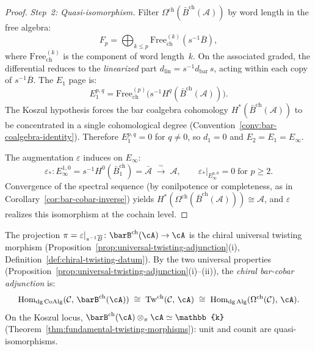\begin{proof}
\emph{Step~2: Quasi-isomorphism.}
Filter $\Omega^{\mathrm{ch}}(\bar{B}^{\mathrm{ch}}(\mathcal{A}))$
by word length in the free algebra:
\[
F_p = \bigoplus_{k \leq p}
\mathrm{Free}_{\mathrm{ch}}^{(k)}(s^{-1}\overline{B}),
\]
where $\mathrm{Free}_{\mathrm{ch}}^{(k)}$ is the component of
word length~$k$.
On the associated graded, the differential reduces to the
\emph{linearized} part $d_{\mathrm{lin}} = s^{-1} d_{\mathrm{bar}}\, s$,
acting within each copy of $s^{-1}\overline{B}$.
The $E_1$ page is:
\[
E_1^{p,q}
= \mathrm{Free}_{\mathrm{ch}}^{(p)}\!\bigl(
  s^{-1} H^q(\bar{B}^{\mathrm{ch}}(\mathcal{A}))
\bigr).
\]
The Koszul hypothesis forces the bar coalgebra cohomology
$H^*(\bar{B}^{\mathrm{ch}}(\mathcal{A}))$
to be concentrated in a single cohomological degree
(Convention~\ref{conv:bar-coalgebra-identity}).
Therefore $E_1^{p,q} = 0$ for $q \neq 0$, so $d_1 = 0$ and
$E_2 = E_1 = E_\infty$.

The augmentation $\varepsilon$ induces on $E_\infty$:
\[
\varepsilon_*\colon E_\infty^{1,0}
= s^{-1}H^0(\bar{B}^{\mathrm{ch}}_1) = \bar{\mathcal{A}}
\;\xrightarrow{\;\sim\;}\; \mathcal{A},
\qquad
\varepsilon_*|_{E_\infty^{p,0}} = 0 \;\text{for } p \geq 2.
\]
Convergence of the spectral sequence (by conilpotence or
completeness, as in
Corollary~\ref{cor:bar-cobar-inverse})
yields
$H^*(\Omega^{\mathrm{ch}}(\bar{B}^{\mathrm{ch}}(\mathcal{A})))
\cong \mathcal{A}$,
and $\varepsilon$ realizes this isomorphism at the cochain level.
\end{proof}

\begin{remark}
\label{rem:chiral-adjunction-via-tw}
The projection
$\pi = \varepsilon|_{s^{-1}\overline{B}}\colon
\barB^{\mathrm{ch}}(\cA) \to \cA$
is the chiral universal twisting morphism
(Proposition~\ref{prop:universal-twisting-adjunction}(i),
Definition~\ref{def:chiral-twisting-datum}).
By the two universal properties
(Proposition~\ref{prop:universal-twisting-adjunction}(i)--(ii)),
the \emph{chiral bar-cobar adjunction} is:
\begin{equation}\label{eq:chiral-tw-adjunction}
\mathrm{Hom}_{\mathrm{dg\,CoAlg}}(\mathcal{C},\,
  \barB^{\mathrm{ch}}(\cA))
\;\cong\;
\mathrm{Tw}^{\mathrm{ch}}(\mathcal{C},\, \cA)
\;\cong\;
\mathrm{Hom}_{\mathrm{dg\,Alg}}(\Omega^{\mathrm{ch}}(\mathcal{C}),\,
  \cA).
\end{equation}
On the Koszul locus,
$\barB^{\mathrm{ch}}(\cA) \otimes_\pi \cA \simeq \mathbb{k}$
(Theorem~\ref{thm:fundamental-twisting-morphisms}): unit and counit
are quasi-isomorphisms.
\end{remark}


